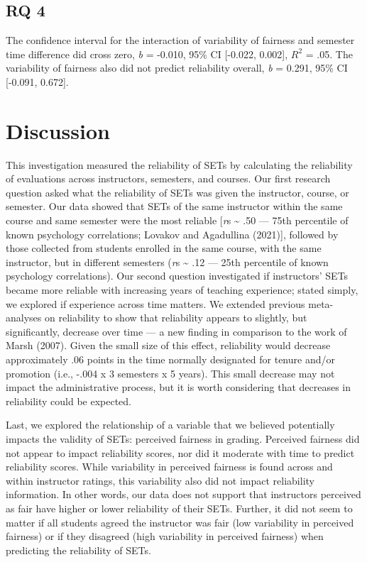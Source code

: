 \documentclass[
  man]{apa7}
\begin{document}
\hypertarget{rq-4-1}{%
\subsection{RQ 4}\label{rq-4-1}}

The confidence interval for the interaction of variability of fairness
and semester time difference did cross zero, \emph{b} =
-0.010, 95\% CI
{[}-0.022,
0.002{]}, \(R^2\) =
.05.
The variability of fairness also did not predict reliability overall,
\emph{b} = 0.291, 95\% CI
{[}-0.091,
0.672{]}.

\hypertarget{discussion}{%
\section{Discussion}\label{discussion}}

This investigation measured the reliability of SETs by calculating the
reliability of evaluations across instructors, semesters, and courses.
Our first research question asked what the reliability of SETs was given
the instructor, course, or semester. Our data showed that SETs of the
same instructor within the same course and same semester were the most
reliable {[}\emph{r}s \textasciitilde{} .50 --- 75th percentile of known psychology
correlations; Lovakov and Agadullina (2021){]}, followed by those collected from students
enrolled in the same course, with the same instructor, but in different
semesters (\emph{r}s \textasciitilde{} .12 --- 25th percentile of known psychology
correlations). Our second question investigated if instructors' SETs
became more reliable with increasing years of teaching experience;
stated simply, we explored if experience across time matters. We
extended previous meta-analyses on reliability to show that reliability
appears to slightly, but significantly, decrease over time --- a new
finding in comparison to the work of Marsh (2007). Given the small size of
this effect, reliability would decrease approximately .06 points in the
time normally designated for tenure and/or promotion (i.e., -.004 x 3
semesters x 5 years). This small decrease may not impact the
administrative process, but it is worth considering that decreases in
reliability could be expected.

Last, we explored the relationship of a variable that we believed
potentially impacts the validity of SETs: perceived fairness in grading.
Perceived fairness did not appear to impact reliability scores, nor did
it moderate with time to predict reliability scores. While variability
in perceived fairness is found across and within instructor ratings,
this variability also did not impact reliability information. In other
words, our data does not support that instructors perceived as fair have
higher or lower reliability of their SETs. Further, it did not seem to
matter if all students agreed the instructor was fair (low variability
in perceived fairness) or if they disagreed (high variability in
perceived fairness) when predicting the reliability of SETs.
\end{document}
